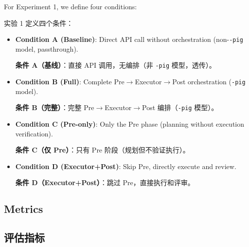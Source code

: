 For Experiment 1, we define four conditions:
\begin{chinese}
实验 1 定义四个条件：
\end{chinese}
\begin{itemize}
    \item \textbf{Condition A (Baseline)}: Direct API call without orchestration (non-\texttt{-pig} model, passthrough).
    \begin{chinese}
    \textbf{条件 A（基线）}：直接 API 调用，无编排（非 \texttt{-pig} 模型，透传）。
    \end{chinese}
    \item \textbf{Condition B (Full)}: Complete Pre$\rightarrow$Executor$\rightarrow$Post orchestration (\texttt{-pig} model).
    \begin{chinese}
    \textbf{条件 B（完整）}：完整 Pre$\rightarrow$Executor$\rightarrow$Post 编排（\texttt{-pig} 模型）。
    \end{chinese}
    \item \textbf{Condition C (Pre-only)}: Only the Pre phase (planning without execution verification).
    \begin{chinese}
    \textbf{条件 C（仅 Pre）}：只有 Pre 阶段（规划但不验证执行）。
    \end{chinese}
    \item \textbf{Condition D (Executor+Post)}: Skip Pre, directly execute and review.
    \begin{chinese}
    \textbf{条件 D（Executor+Post）}：跳过 Pre，直接执行和评审。
    \end{chinese}
\end{itemize}

\subsection{Metrics}
\begin{chinese}
\subsection*{评估指标}
\end{chinese}

